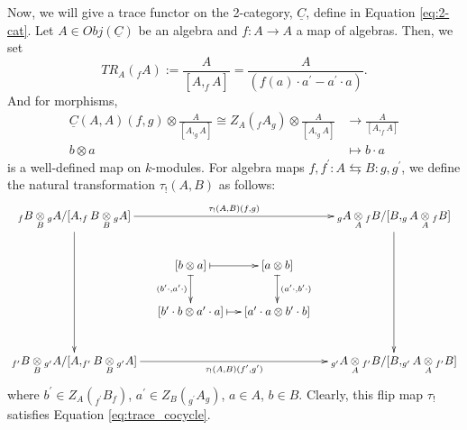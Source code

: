 %
Now, we will give a trace functor on the 
2-category, $\underline{C}$, define in Equation 
\ref{eq:2-cat}. Let $A \in Obj(\underline{C})$ 
be an algebra and $f: A \to A$ a map of algebras. 
Then, we set
$$TR_A(_fA) := \frac{A}{[A, _fA]}
= \frac{A}{(f(a)\cdot a^\prime - a^\prime \cdot a)}.$$
And for morphisms, 
\begin{align*}
\underline{C}(A,A)(f,g) \otimes \frac{A}{[A, _gA]}
\cong Z_A(_fA_g) \otimes \frac{A}{[A, _gA]}
&\to \frac{A}{[A, _fA]}\\
b \otimes a
&\mapsto 
b\cdot a
\end{align*}
is a well-defined map on $k$-modules. 
For algebra maps $f,f^\prime:A \leftrightarrows 
B:g,g^\prime$, 
we define 
the natural transformation $\tau_!(A,B)$ 
as follows:
$$
\xymatrixcolsep{1pc}
\xymatrix{
  _fB \underset{B}{\otimes} { _gA}/
    [A, _fB \underset{B}{\otimes} { _gA}]
  \ar[rrr]^{\tau_!(A,B)(f,g)}
  \ar[ddd]
  &&& _gA \underset{A}{\otimes} { _fB}/
    [B, _gA \underset{A}{\otimes} { _fB}]
  \ar[ddd]\\
  &[b \otimes a] 
  \ar@{|->}[r]
  \ar@{|->}[d]_{(b^\prime \cdot, a^\prime \cdot)}
  & [a \otimes b]
  \ar@{|->}[d]^{(a^\prime \cdot, b^\prime \cdot)}\\
  & [b^\prime \cdot b \otimes a^\prime \cdot a]
  \ar@{|->}[r]
  & [a^\prime \cdot a \otimes b^\prime \cdot b]\\
  _{f^\prime}B \underset{B}{\otimes} { _{g^\prime}A}/
    [A, _{f^\prime}B \underset{B}{\otimes} { _{g^\prime}A}]
  \ar[rrr]_{\tau_!(A,B)(f^\prime,g^\prime)}
  &&& _{g^\prime}A \underset{A}{\otimes} { _{f^\prime}B}/
  [B, _{g^\prime}A \underset{A}{\otimes} { _{f^\prime}B}]\\
}
$$
where $b^\prime \in Z_A(_{f^\prime}B_f)$, 
$a^\prime \in Z_B(_{g^\prime}A_g)$, $a \in A$, 
$b \in B$. Clearly, this flip map $\tau_!$ satisfies 
Equation \ref{eq:trace_cocycle}.





